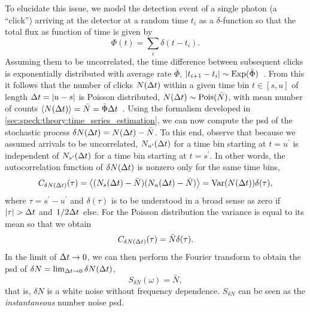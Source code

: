 To elucidate this issue, we model the detection event of a single photon (a \enquote{click}) arriving at the detector at a random time $t_i$ as a $\delta$-function so that the total flux as function of time is given by
\begin{equation}\label{eq:setup:flux_comb}
    \Phi(t) = \sum_i \delta(t-t_i).
\end{equation}
Assuming them to be uncorrelated, the time difference between subsequent clicks is exponentially distributed with average rate $\bar{\Phi}$, $\lvert t_{i+1}-t_i\rvert\sim\operatorname{Exp}(\bar{\Phi})$~\cite{ExponentialDistributionWiki}.
From this it follows that the number of clicks $N(\Delta t)$ within a given time bin $t\in [s, u]$ of length $\Delta t = \lvert u - s\rvert$ is Poisson distributed, $N(\Delta t)\sim\operatorname{Pois}(\bar{N})$, with mean number of counts $\expval{N(\ensuremath{\Delta t})} = \bar{N} = \bar{\Phi}\Delta t$~\cite{PoissonDistributionWiki}.
Using the formalism developed in \cref{sec:speck:theory:time_series_estimation}, we can now compute the \gls{psd} of the stochastic process $\delta N(\Delta t) = N(\Delta t) - \bar{N}$.
To this end, observe that because we assumed arrivals to be uncorrelated, $N_{u^\prime}(\Delta t)$ for a time bin starting at $t=u^\prime$ is independent of $N_{s^\prime}(\Delta t)$ for a time bin starting at $t=s^\prime$.
In other words, the autocorrelation function of $\delta N(\Delta t)$ is nonzero only for the same time bins,
\begin{equation}\label{eq:setup:poisson:autocorrelation}
    C_{\delta N(\Delta t)}(\tau) = \expval{(N_s(\ensuremath{\Delta t}) - \bar{N})(N_u(\ensuremath{\Delta t}) - \bar{N})} = \operatorname{Var}(N(\Delta t))\delta(\tau),
\end{equation}
where $\tau = s^\prime - u^\prime$ and $\delta(\tau)$ is to be understood in a broad sense as zero if $\abs{\tau} > \Delta t$ and $\flatfrac{1}{2\dt}$ else.
For the Poisson distribution the variance is equal to its mean so that we obtain
\begin{equation}\label{eq:setup:poisson:autocorrelation:evaluated}
    C_{\delta N(\Delta t)}(\tau) = \bar{N}\delta(\tau).
\end{equation}
In the limit of $\Delta t\to 0$, we can then perform the Fourier transform to obtain the \gls{psd} of $\delta N = \lim_{\Delta t\to 0}\delta N(\Delta t)$,
\begin{equation}\label{eq:setup:poisson:psd}
    S_{\delta N}(\omega) = \bar{N},
\end{equation}
that is, $\delta N$ is a white noise without frequency dependence.
$S_{\delta N}$ can be seen as the \emph{instantaneous} number noise \gls{psd}.


